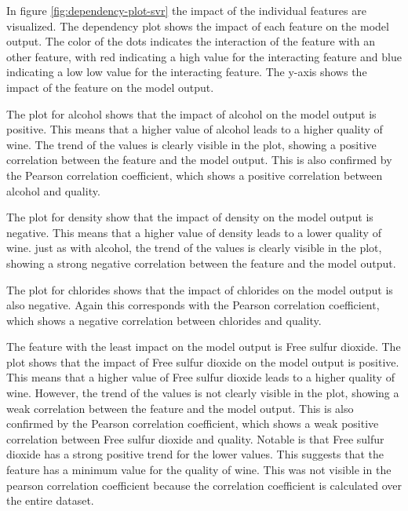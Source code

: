 \documentclass{article}
\begin{document}
In figure \autoref{fig:dependency-plot-svr}  the impact of the individual features are visualized.
The dependency plot shows the impact of each feature on the model output.
The color of the dots indicates the interaction of the feature with an other feature, with red indicating a high value for the interacting feature and blue indicating a low low value for the interacting feature.
The y-axis shows the impact of the feature on the model output.

The plot for alcohol shows that the impact of alcohol on the model output is positive.
This means that a higher value of alcohol leads to a higher quality of wine.
The trend of the values is clearly visible in the plot, showing a positive correlation between the feature and the model output. %
This is also confirmed by the Pearson correlation coefficient, which shows a positive correlation between alcohol and quality.

The plot for density show that the impact of density on the model output is negative.
This means that a higher value of density leads to a lower quality of wine.
just as with alcohol, the trend of the values is clearly visible in the plot, showing a strong negative correlation between the feature and the model output.

The plot for chlorides shows that the impact of chlorides on the model output is also negative.
Again this corresponds with the Pearson correlation coefficient, which shows a negative correlation between chlorides and quality.

The feature with the least impact on the model output is Free sulfur dioxide.
The plot shows that the impact of Free sulfur dioxide on the model output is positive.
This means that a higher value of Free sulfur dioxide leads to a higher quality of wine.
However, the trend of the values is not clearly visible in the plot, showing a weak correlation between the feature and the model output.
This is also confirmed by the Pearson correlation coefficient, which shows a weak positive correlation between Free sulfur dioxide and quality.
Notable is that Free sulfur dioxide has a strong positive trend for the lower values. This suggests that the feature has a minimum value for the quality of wine.
This was not visible in the pearson correlation coefficient because the correlation coefficient is calculated over the entire dataset.
\end{document}
